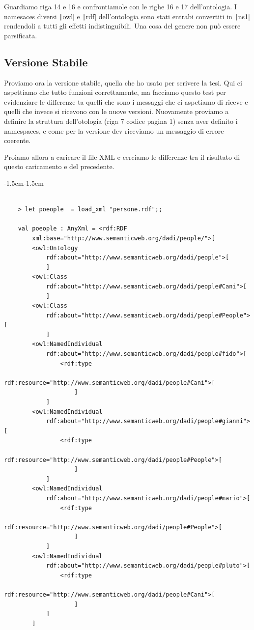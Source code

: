 \documentclass[]{article}
\begin{document}
Guardiamo riga 14 e 16 e confrontiamole con le righe 16 e 17 dell'ontologia. I namesaces diversi \texttt|owl| e \texttt|rdf| dell'ontologia sono stati entrabi convertiti in \texttt|ns1| rendendoli a tutti gli effetti indistinguibili. Una cosa del genere non può essere parsificata.

\subsection{Versione Stabile}
Proviamo ora la versione stabile, quella che ho usato per scrivere la tesi. Qui ci aspettiamo che tutto funzioni correttamente, ma facciamo questo test per evidenziare le differenze ta quelli che sono i messaggi che ci aspetiamo di riceve e quelli che invece si ricevono con le nuove versioni. Nuovamente proviamo a definire la struttura dell'otologia (riga 7 codice pagina 1) senza aver definito i namespaces, e come per la versione dev riceviamo un messaggio di errore coerente.

Proiamo allora a caricare il file XML e cerciamo le differenze tra il risultato di questo caricamento e del precedente.

\begin{adjustwidth}{-1.5cm}{-1.5cm}	
	\begin{minipage}{\linewidth} 
		\begin{verbatim}
			
	> let poeople  = load_xml "persone.rdf";;
	
	val poeople : AnyXml = <rdf:RDF
		xml:base="http://www.semanticweb.org/dadi/people/">[
		<owl:Ontology
			rdf:about="http://www.semanticweb.org/dadi/people">[
			]
		<owl:Class
			rdf:about="http://www.semanticweb.org/dadi/people#Cani">[
			]
		<owl:Class
			rdf:about="http://www.semanticweb.org/dadi/people#People">[
			]
		<owl:NamedIndividual
			rdf:about="http://www.semanticweb.org/dadi/people#fido">[
				<rdf:type
					rdf:resource="http://www.semanticweb.org/dadi/people#Cani">[
					]
			]
		<owl:NamedIndividual
			rdf:about="http://www.semanticweb.org/dadi/people#gianni">[
				<rdf:type
					rdf:resource="http://www.semanticweb.org/dadi/people#People">[
					]
			]
		<owl:NamedIndividual
			rdf:about="http://www.semanticweb.org/dadi/people#mario">[
				<rdf:type
					rdf:resource="http://www.semanticweb.org/dadi/people#People">[
					]
			]
		<owl:NamedIndividual
			rdf:about="http://www.semanticweb.org/dadi/people#pluto">[
				<rdf:type
					rdf:resource="http://www.semanticweb.org/dadi/people#Cani">[
					]
			]
		]			
			
		\end{verbatim}
	\end{minipage}
\end{adjustwidth}
\end{document}
